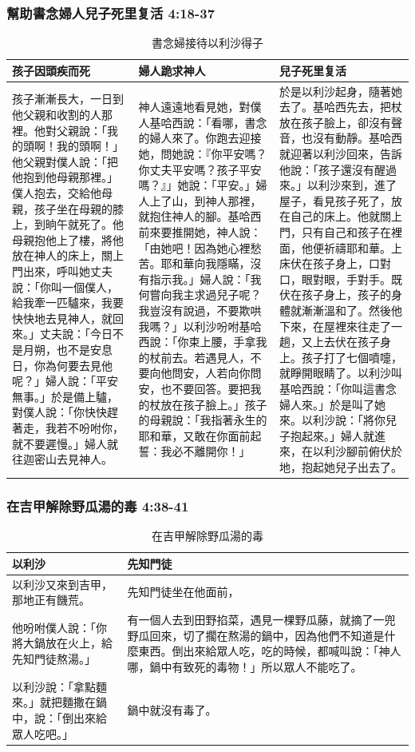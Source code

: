 \subsubsection{幫助書念婦人兒子死里复活 4:18-37}
\begin{table}[H]
\centering
\begin{tabular}{p{5.15cm}|p{5.5cm}|p{}}\hline\hline
孩子因頭疾而死&婦人跪求神人&兒子死里复活\\\hline
孩子漸漸長大，一日到他父親和收割的人那裡。他對父親說：「我的頭啊！我的頭啊！」他父親對僕人說：「把他抱到他母親那裡。」僕人抱去，交給他母親，孩子坐在母親的膝上，到晌午就死了。他母親抱他上了樓，將他放在神人的床上，關上門出來，呼叫她丈夫說：「你叫一個僕人，給我牽一匹驢來，我要快快地去見神人，就回來。」丈夫說：「今日不是月朔，也不是安息日，你為何要去見他呢？」婦人說：「平安無事。」於是備上驢，對僕人說：「你快快趕著走，我若不吩咐你，就不要遲慢。」婦人就往迦密山去見神人。
&神人遠遠地看見她，對僕人基哈西說：「看哪，書念的婦人來了。你跑去迎接她，問她說：『你平安嗎？你丈夫平安嗎？孩子平安嗎？』」她說：「平安。」婦人上了山，到神人那裡，就抱住神人的腳。基哈西前來要推開她，神人說：「由她吧！因為她心裡愁苦。耶和華向我隱瞞，沒有指示我。」婦人說：「我何嘗向我主求過兒子呢？我豈沒有說過，不要欺哄我嗎？」以利沙吩咐基哈西說：「你束上腰，手拿我的杖前去。若遇見人，不要向他問安，人若向你問安，也不要回答。要把我的杖放在孩子臉上。」孩子的母親說：「我指著永生的耶和華，又敢在你面前起誓：我必不離開你！」
&於是以利沙起身，隨著她去了。基哈西先去，把杖放在孩子臉上，卻沒有聲音，也沒有動靜。基哈西就迎著以利沙回來，告訴他說：「孩子還沒有醒過來。」以利沙來到，進了屋子，看見孩子死了，放在自己的床上。他就關上門，只有自己和孩子在裡面，他便祈禱耶和華。上床伏在孩子身上，口對口，眼對眼，手對手。既伏在孩子身上，孩子的身體就漸漸溫和了。然後他下來，在屋裡來往走了一趟，又上去伏在孩子身上。孩子打了七個噴嚏，就睜開眼睛了。以利沙叫基哈西說：「你叫這書念婦人來。」於是叫了她來。以利沙說：「將你兒子抱起來。」婦人就進來，在以利沙腳前俯伏於地，抱起她兒子出去了。\\\hline
\end{tabular}
\caption{書念婦接待以利沙得子}
\end{table}


\subsubsection{在吉甲解除野瓜湯的毒 4:38-41}
\begin{table}[H]
\centering
\begin{tabular}{p{5.5cm}|p{11.25cm}}\hline\hline
以利沙&先知門徒\\\hline
以利沙又來到吉甲，那地正有饑荒。&先知門徒坐在他面前，\\\hline
他吩咐僕人說：「你將大鍋放在火上，給先知門徒熬湯。」&有一個人去到田野掐菜，遇見一棵野瓜藤，就摘了一兜野瓜回來，切了擱在熬湯的鍋中，因為他們不知道是什麼東西。倒出來給眾人吃，吃的時候，都喊叫說：「神人哪，鍋中有致死的毒物！」所以眾人不能吃了。\\\hline
以利沙說：「拿點麵來。」就把麵撒在鍋中，說：「倒出來給眾人吃吧。」&鍋中就沒有毒了。\\\hline
\end{tabular}
\caption{在吉甲解除野瓜湯的毒}
\end{table}
 

